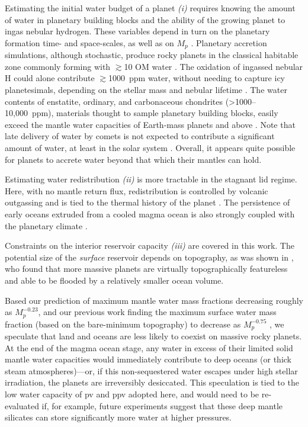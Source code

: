 \documentclass[fleqn,usenatbib]{mnras}
\begin{document}
Estimating the initial water budget of a planet \textit{(i)} requires knowing the amount of water in planetary building blocks and the ability of the growing planet to ingas nebular hydrogen. These variables depend in turn on the planetary formation time- and space-scales, as well as on $M_p$ \citep[and references therein]{sharp_nebular_2017, unterborn_inward_2018, kimura_formation_2020, ohtani_hydration_2021}. Planetary accretion simulations, although stochastic, produce rocky planets in the classical habitable zone commonly forming with $\gtrsim$10 OM water \citep{raymond_making_2004, raymond_high-resolution_2006, zain_planetary_2018}. The oxidation of ingassed nebular H could alone contribute $\gtrsim$1000~ppm water, without needing to capture icy planetesimals, depending on the stellar mass and nebular lifetime \citep{olson_nebular_2019, kimura_predicted_2022}. The water contents of enstatite, ordinary, and carbonaceous chondrites (\textgreater 1000--10,000~ppm), materials thought to sample planetary building blocks, easily exceed the mantle water capacities of Earth-mass planets and above \citep{abe_water_2000}. Note that late delivery of water by comets is not expected to contribute a significant amount of water, at least in the solar system \citep{morbidelli_source_2000}. Overall, it appears quite possible for planets to accrete water beyond that which their mantles can hold.



Estimating water redistribution \textit{(ii)} is more tractable in the stagnant lid regime. Here, with no mantle return flux, redistribution is controlled by volcanic outgassing and is tied to the thermal history of the planet \citep[e.g.,][]{ortenzi_mantle_2020}. The persistence of early oceans extruded from a cooled magma ocean is also strongly coupled with the planetary climate \citep[e.g.,][]{elkins-tanton_formation_2011, miyazaki_wet_2022}. 

Constraints on the interior reservoir capacity \textit{(iii)} are covered in this work. The potential size of the \textit{surface} reservoir depends on topography, as was shown in \citet{guimond_blue_2022}, who found that more massive planets are virtually topographically featureless and able to be flooded by a relatively smaller ocean volume.

Based our prediction of maximum mantle water mass fractions decreasing roughly as $M_p^{-0.23}$, and our previous work finding the maximum surface water mass fraction (based on the bare-minimum topography) to decrease as $M_p^{-0.75}$ \citep{guimond_blue_2022}, we speculate that land and oceans are less likely to coexist on massive rocky planets. At the end of the magma ocean stage, any water in excess of their limited solid mantle water capacities would immediately contribute to deep oceans (or thick steam atmospheres)---or, if this non-sequestered water escapes under high stellar irradiation, the planets are irreversibly desiccated. This speculation is tied to the low water capacity of pv and ppv adopted here, and would need to be re-evaluated if, for example, future experiments suggest that these deep mantle silicates can store significantly more water at higher pressures.
\end{document}
